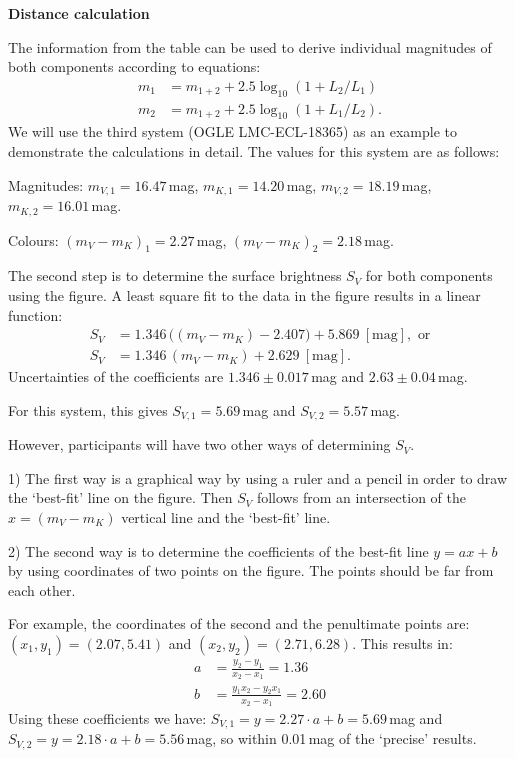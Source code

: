 \textbf{Distance calculation}

The information from the table can be used to derive individual magnitudes of
both components according to equations:
\begin{align*}
  m_1 &= m_{1+2} + 2.5\log_{10}(1 + L_2/L_1) \\
  m_2 &= m_{1+2} + 2.5\log_{10}(1 + L_1/L_2).
\end{align*}
We will use the third system (OGLE LMC-ECL-18365) as an example to
demonstrate the calculations in detail. The values for this system are as
follows:

Magnitudes: $m_{V,1} = 16.47$\,mag, $m_{K,1} = 14.20$\,mag,
$m_{V,2} = 18.19$\,mag, $m_{K,2} = 16.01$\,mag.

Colours: $(m_V - m_K)_1 = 2.27$\,mag, $(m_V - m_K)_2 = 2.18$\,mag.

The second step is to determine the surface brightness $S_V$ for both
components using the figure. A least square fit to the data in the figure
results in a linear function:
\begin{align*}
  S_V &= 1.346\,\big((m_V - m_K) - 2.407\big) + 5.869\ [\mathrm{mag}],
    \text{ or} \\
  S_V &= 1.346\,(m_V - m_K) + 2.629\ [\mathrm{mag}].
\end{align*}
Uncertainties of the coefficients are $1.346 \pm 0.017$\,mag and
$2.63 \pm 0.04$\,mag.

For this system, this gives $S_{V,1} = 5.69$\,mag and $S_{V,2} = 5.57$\,mag.

However, participants will have two other ways of determining $S_V$.

1) The first way is a graphical way by using a ruler and a pencil in order to
draw the `best-fit' line on the figure. Then $S_V$ follows from an
intersection of the $x = (m_V - m_K)$ vertical line and the `best-fit' line.

2) The second way is to determine the coefficients of the best-fit line
$y = ax + b$ by using coordinates of two points on the figure. The points
should be far from each other.

For example, the coordinates of the second and the penultimate points are:
$(x_1, y_1) = (2.07, 5.41)$ and $(x_2, y_2) = (2.71, 6.28)$. This results in:
\begin{align*}
  a &= \frac{y_2 - y_1}{x_2 - x_1} = 1.36 \\
  b &= \frac{y_1 x_2 - y_2 x_1}{x_2 - x_1} = 2.60
\end{align*}
Using these coefficients we have:
$S_{V,1} = y = 2.27\cdot a + b = 5.69$\,mag and
$S_{V,2} = y = 2.18\cdot a + b = 5.56$\,mag, so within 0.01\,mag of the
`precise' results.

